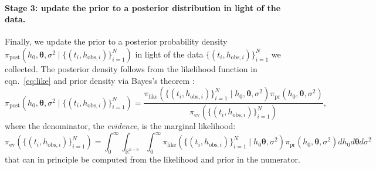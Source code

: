 \documentclass[openacc]{rsproca_new}%
\newcommand\thedata {$\{(t_i,h_{\text{obs}, i})\}_{i=1}^{N}$\xspace}
\newcommand\thedatanomath {\{(t_i,h_{\text{obs}, i})\}_{i=1}^{N}}
\begin{document}
\vspace{-\baselineskip}
\paragraph{Stage 3: update the prior to a posterior distribution in light of the data.}
Finally, we update the prior to a posterior probability density $\pi_{\text{post}}(h_0, \boldsymbol \theta, \sigma^2 \mid \thedatanomath)$ in light of the data \thedata we collected. 
The posterior density follows from the likelihood function in eqn.~\ref{eq:like} and prior density via Bayes's theorem \cite{van2021bayesian,calvetti2018inverse}:
\begin{equation}
	\pi_{\text{post}}(h_0, \boldsymbol \theta, \sigma^2 \mid \thedatanomath) = \frac{
	\pi_{\text{like}}(\thedatanomath \mid h_0, \boldsymbol \theta, \sigma^2 ) 
	\pi_{\text{pr}}(h_0, \boldsymbol \theta, \sigma^2)
	}{
	\pi_{\text{ev}}(\thedatanomath) 
	}, \label{eq:post}
\end{equation} where the denominator, the \emph{evidence}, is the marginal likelihood:
\begin{equation}
    \pi_{\text{ev}}(\thedatanomath) = \int_0^\infty \int_{\mathbb{R}^{n+6}} \int_0^\infty \pi_{\text{like}}(\thedatanomath \mid h_0 \boldsymbol \theta, \sigma^2)  
	\pi_{\text{pr}}(h_0, \boldsymbol \theta, \sigma^2) dh_0 d \boldsymbol\theta d\sigma^2 \label{eq:ev}
\end{equation}
that can in principle be computed from the likelihood and prior in the numerator. 
\end{document}
